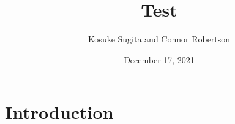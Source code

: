\documentclass{beamer}
\title{Test}
\author{Kosuke Sugita and Connor Robertson}
\date{December 17, 2021}
\begin{document}
\frame{\titlepage}

\section{Introduction}
\begin{frame}
    \sectionpage
\end{frame}
\end{document}
